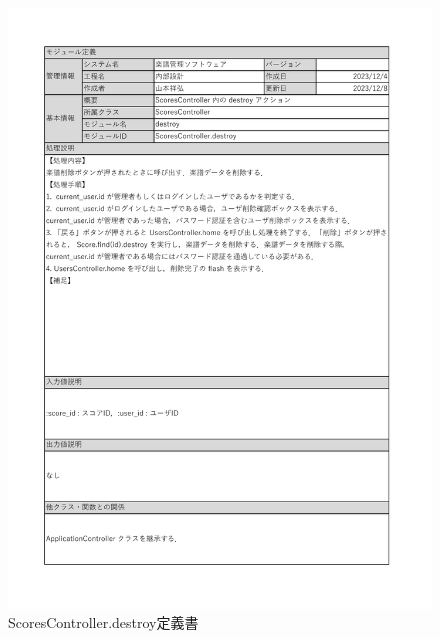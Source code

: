\begin{figure}
    \centering
    \includegraphics[scale=0.7]{img/Scores/xlsx/ScoresController_destroy.pdf}
    \caption{ScoresController.destroy定義書}
\end{figure}
